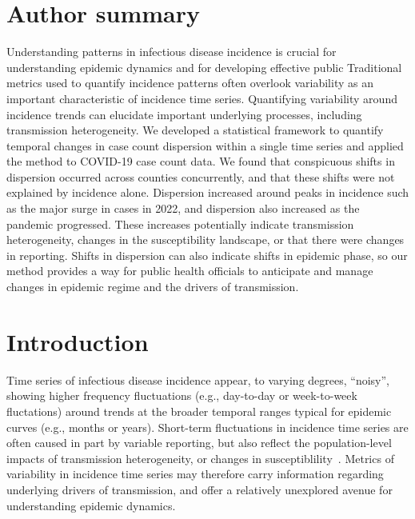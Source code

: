 \documentclass[11pt,letterpaper]{article}
\begin{document}
\section*{Author summary}
Understanding patterns in infectious disease incidence is crucial for understanding epidemic dynamics and for developing effective public Traditional metrics used to quantify incidence patterns often overlook variability as an important characteristic of incidence time series. 
Quantifying variability around incidence trends can elucidate important underlying processes, including transmission heterogeneity.
We developed a statistical framework to quantify temporal changes in case count dispersion within a single time series and applied the method to COVID-19 case count data. 
We found that conspicuous shifts in dispersion occurred across counties concurrently, and that these shifts were not explained by incidence alone. 
Dispersion increased around peaks in incidence such as the major surge in cases in 2022, and dispersion also increased as the pandemic progressed. 
These increases potentially indicate transmission heterogeneity, changes in the susceptibility landscape, or that there were changes in reporting.
Shifts in dispersion can also indicate shifts in epidemic phase, so our method provides a way for public health officials to anticipate and manage changes in epidemic regime and the drivers of transmission. 

\clearpage
\section*{Introduction}
Time series of infectious disease incidence appear, to varying degrees, ``noisy'', showing higher frequency fluctuations (e.g., day-to-day or week-to-week fluctations) around trends at the broader temporal ranges typical for epidemic curves (e.g., months or years).
Short-term fluctuations in incidence time series are often caused in part by variable reporting, but also reflect the population-level impacts of transmission heterogeneity, or changes in susceptiblility~\citep{lloyd2005superspreading, kirkegaard2021superspreading, sun2021transmission,guo2023statistical,ko2023time}.
Metrics of variability in incidence time series may therefore carry information regarding underlying drivers of transmission, and offer a relatively unexplored avenue for understanding epidemic dynamics. 
\end{document}
